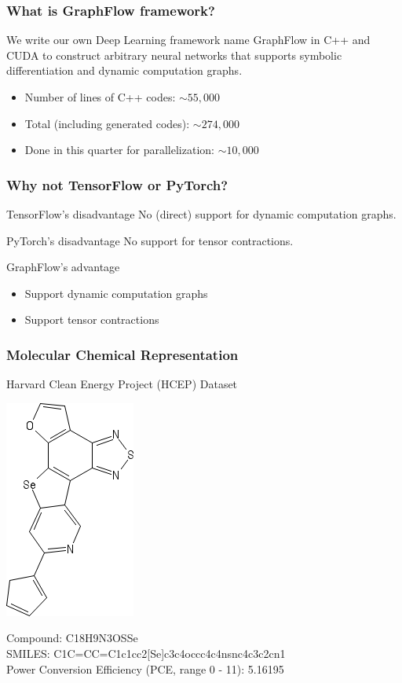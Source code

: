 \documentclass{beamer}
\begin{document}
\begin{frame}
\frametitle{What is GraphFlow framework?}
We write our own Deep Learning framework name {\color{red} GraphFlow} in C++ and CUDA to construct arbitrary neural networks that supports symbolic differentiation and dynamic computation graphs. 
\begin{itemize}
	\item Number of lines of C++ codes: $\sim 55,000$
	\item Total (including generated codes): $\sim 274,000$
	\item Done in this quarter for parallelization: {\color{red} $\sim 10,000$}
\end{itemize}
\end{frame}

\begin{frame}
\frametitle{Why not TensorFlow or PyTorch?}
\begin{block}{TensorFlow's disadvantage}
No (direct) support for dynamic computation graphs.
\end{block}
\begin{block}{PyTorch's disadvantage}
No support for tensor contractions.
\end{block}
\begin{alertblock}{GraphFlow's advantage}
	\begin{itemize}
		\item Support dynamic computation graphs
		\item Support tensor contractions
	\end{itemize}
\end{alertblock}
\end{frame}

\begin{frame}
\frametitle{Molecular Chemical Representation}
\begin{justify}
\begin{center}
	Harvard Clean Energy Project (HCEP) Dataset \cite{Johannes}
\end{center}
\begin{center}
	\includegraphics[scale=0.5]{sketcher}
\end{center}
Compound: C18H9N3OSSe \\
SMILES: C1C=CC=C1c1cc2[Se]c3c4occc4c4nsnc4c3c2cn1 \\
Power Conversion Efficiency (PCE, range 0 - 11): 5.16195
\end{justify}
\end{frame}
\end{document}
